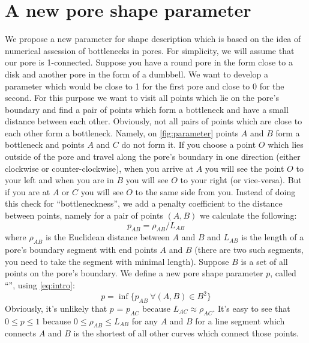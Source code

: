 \documentclass[reprint,amsmath,amssymb,aps,pre,showkeys,showpacs]{revtex4-1}
\newcommand{\highlight}[1]{{\color{red}{#1}}} %
\begin{document}
\section{A new pore shape parameter}
We propose a new parameter for shape description which is based on the idea of
numerical assession of bottlenecks in pores. For simplicity, we will assume
that our pore is 1-connected. Suppose you have a round pore in the form close to
a disk and another pore in the form of a dumbbell. We want to develop a
parameter which would be close to 1 for the first pore and close to 0 for the
second. For this purpose we want to visit all points which lie on the pore's
boundary and find a pair of points which form a bottleneck and have a small
distance between each other. Obviously, not all pairs of points which are close
to each other form a bottleneck. Namely, on \cref{fig:parameter} points $A$ and
$B$ form a bottleneck and points $A$ and $C$ do not form it. If you choose a
point $O$ which lies outside of the pore and travel along the pore's boundary in
one direction (either clockwise or counter-clockwise), when you arrive at $A$
you will see the point $O$ to your left and when you are in $B$ you will see $O$
to your right (or vice-versa). But if you are at $A$ or $C$ you will see $O$ to
the same side from you. Instead of doing this check for ``bottleneckness'', we
add a penalty coefficient to the distance between points, namely for a pair of
points $(A, B)$ we calculate the following:
\begin{equation}
  p_{AB} = \rho_{AB} / L_{AB}
  \label{eq:intro}
\end{equation}
where $\rho_{AB}$ is the Euclidean distance between $A$ and $B$ and $L_{AB}$ is
the length of a pore's boundary segment with end points $A$ and $B$ (there are
two such segments, you need to take the segment with minimal length). Suppose
$B$ is a set of all points on the pore's boundary. We define a new pore shape
parameter $p$, called ``\highlight{awesomeness}'', using \ref{eq:intro}:
\begin{equation}
  p = \inf \{p_{AB} \ \forall (A, B) \in B^2\}
  \label{eq:awesomeness}
\end{equation}
Obviously, it's unlikely that $p$ = $p_{AC}$ because $L_{AC} \approx \rho_{AC}$.
It's easy to see that $0 \le p \le 1$ because $0 \le \rho_{AB} \le L_{AB}$ for
any $A$ and $B$ for a line segment which connects $A$ and $B$ is the shortest
of all other curves which connect those points.
\end{document}
